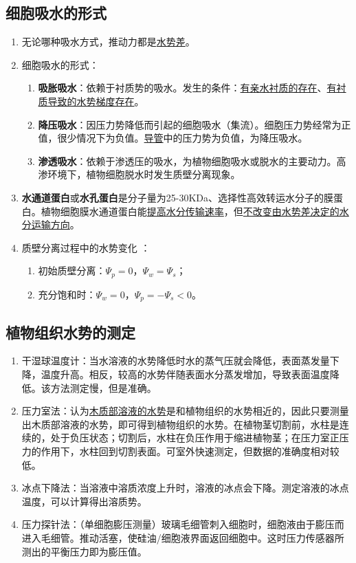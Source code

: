 \subsection{细胞吸水的形式}
\begin{enumerate}
    \item 无论哪种吸水方式，推动力都是\uline{水势差}。
    \item 细胞吸水的形式：
    \begin{enumerate}
        \item \textbf{吸胀吸水}：依赖于衬质势的吸水。发生的条件：\uline{有亲水衬质的存在}、\uline{有衬质导致的水势梯度存在}。
        \item \textbf{降压吸水}：因压力势降低而引起的细胞吸水（集流）。细胞压力势经常为正值，很少情况下为负值。\uline{导管}中的压力势为负值，为降压吸水。
        \item \textbf{渗透吸水}：依赖于渗透压的吸水，为植物细胞吸水或脱水的主要动力。高渗环境下，植物细胞脱水时发生质壁分离现象。
    \end{enumerate}
    \item \textbf{水通道蛋白}或\textbf{水孔蛋白}是分子量为25-30KDa、选择性高效转运水分子的膜蛋白。植物细胞膜水通道蛋白能\uline{提高水分传输速率}，但\uline{不改变由水势差决定的水分运输方向}。
    \item 质壁分离过程中的水势变化 ：
    \begin{enumerate}
        \item 初始质壁分离：$\Psi_p=0$，$\Psi_w=\Psi_s$；
        \item 充分饱和时：$\Psi_w=0$，$\Psi_p=-\Psi_s<0$。
    \end{enumerate}
\end{enumerate}
\subsection{植物组织水势的测定}
\begin{enumerate}
    \item 干湿球温度计：当水溶液的水势降低时水的蒸气压就会降低，表面蒸发量下降，温度升高。相反，较高的水势伴随表面水分蒸发增加，导致表面温度降低。该方法测定慢，但是准确。
    \item 压力室法：认为\uline{木质部溶液的水势}是和植物组织的水势相近的，因此只要测量出木质部溶液的水势，即可得到植物组织的水势。在植物茎切割前，水柱是连续的，处于负压状态；切割后，水柱在负压作用于缩进植物茎；在压力室正压力的作用下，水柱回到切割表面。可室外快速测定，但数据的准确度相对较低。
    \item 冰点下降法：当溶液中溶质浓度上升时，溶液的冰点会下降。测定溶液的冰点温度，可以计算得出溶质势。
    \item 压力探针法：（单细胞膨压测量）玻璃毛细管刺入细胞时，细胞液由于膨压而进入毛细管。推动活塞，使硅油/细胞液界面返回细胞中。这时压力传感器所测出的平衡压力即为膨压值。
\end{enumerate}

